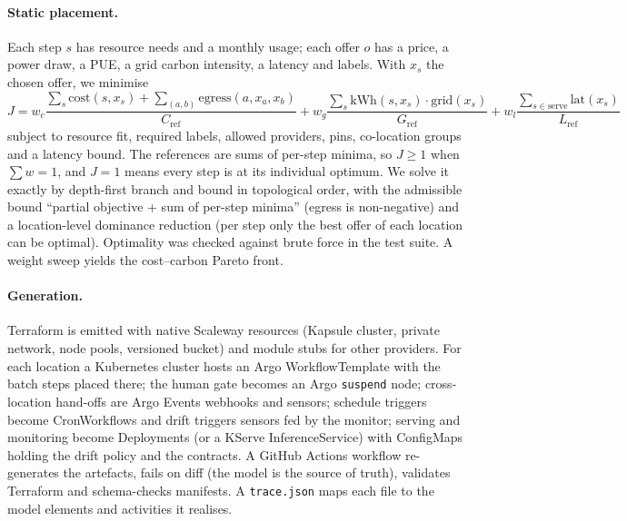 \documentclass[10pt,a4paper]{article}
\begin{document}
\paragraph{Static placement.} Each step \(s\) has resource needs and a monthly
usage; each offer \(o\) has a price, a power draw, a PUE, a grid carbon intensity,
a latency and labels. With \(x_s\) the chosen offer, we minimise
\[
J = w_c\frac{\sum_s \mathrm{cost}(s,x_s)+\sum_{(a,b)}\mathrm{egress}(a,x_a,x_b)}{C_{\mathrm{ref}}}
  + w_g\frac{\sum_s \mathrm{kWh}(s,x_s)\cdot \mathrm{grid}(x_s)}{G_{\mathrm{ref}}}
  + w_l\frac{\sum_{s\in\mathrm{serve}}\mathrm{lat}(x_s)}{L_{\mathrm{ref}}}
\]
subject to resource fit, required labels, allowed providers, pins, co-location
groups and a latency bound. The references are sums of per-step minima, so \(J\ge 1\)
when \(\sum w=1\), and \(J=1\) means every step is at its individual optimum.
We solve it exactly by depth-first branch and bound in topological order, with the
admissible bound ``partial objective + sum of per-step minima'' (egress is
non-negative) and a location-level dominance reduction (per step only the best
offer of each location can be optimal). Optimality was checked against brute force
in the test suite. A weight sweep yields the cost--carbon Pareto front.

\paragraph{Generation.} Terraform is emitted with native Scaleway resources
(Kapsule cluster, private network, node pools, versioned bucket) and module stubs
for other providers. For each location a Kubernetes cluster hosts an Argo
WorkflowTemplate with the batch steps placed there; the human gate becomes an Argo
\texttt{suspend} node; cross-location hand-offs are Argo Events webhooks and
sensors; schedule triggers become CronWorkflows and drift triggers sensors fed by
the monitor; serving and monitoring become Deployments (or a KServe
InferenceService) with ConfigMaps holding the drift policy and the contracts. A
GitHub Actions workflow re-generates the artefacts, fails on diff (the model is
the source of truth), validates Terraform and schema-checks manifests. A
\texttt{trace.json} maps each file to the model elements and activities it realises.
\end{document}
